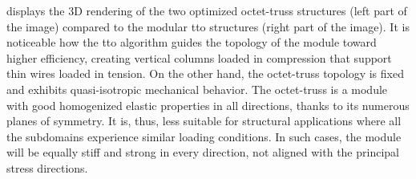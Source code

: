 \begin{figure}
    \hfill
    \hspace*{\fill}
    \bigskip
    \hspace*{\fill}
    \hfill
    \hspace*{\fill}
    \caption{}
    \label{fig:05_octet_results}
\end{figure}

 displays the 3D rendering of the two optimized octet-truss structures (left part of the image) compared to the modular \gls{tto} structures (right part of the image). It is noticeable how the \gls{tto} algorithm guides the topology of the module toward higher efficiency, creating vertical columns loaded in compression that support thin wires loaded in tension. On the other hand, the octet-truss topology is fixed and exhibits quasi-isotropic mechanical behavior. The octet-truss is a module with good homogenized elastic properties in all directions, thanks to its numerous planes of symmetry. It is, thus, less suitable for structural applications where all the subdomains experience similar loading conditions. In such cases, the module will be equally stiff and strong in every direction, not aligned with the principal stress directions.

